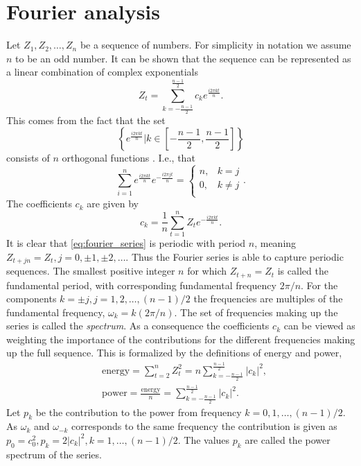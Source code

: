 \documentclass[a4paper, 10pt]{memoir}
\theoremstyle{plain}
\theoremstyle{definition}
\theoremstyle{remark}
\begin{document}
\section{Fourier analysis}
Let $Z_1, Z_2, \hdots, Z_n$ be a sequence of numbers.
For simplicity in notation we assume $n$ to be an odd number.
It can be shown that the sequence can be represented as a linear combination of complex exponentials
\begin{equation}\label{eq:fourier_series}
        Z_t = \sum_{k = -\frac{n-1}{2}}^{\frac{n- 1}{2}}c_k e^{\frac{i2 \pi k t}{n}}.
\end{equation}
This comes from the fact that the set 
\begin{equation*}
        \left\{ e^{\frac{i 2 \pi kt}{n}} \Big| k \in \left[ -\frac{n -1}{2}, \frac{n - 1}{2} \right] \right\}
\end{equation*}
consists of $n$ orthogonal functions \cite{wei}.
I.e., that
\begin{equation*}
        \sum_{i = 1}^{n} e^{\frac{i2 \pi kt}{n}} e^{-\frac{i 2 \pi j t}{n}}= 
                \begin{cases}
                        n, & k = j \\
                        0, & k \neq j \\
                \end{cases}
       .
\end{equation*}
The coefficients $c_k$ are given by
\begin{equation*}
       c_k =  \frac{1}{n}\sum_{ t = 1}^{n}Z_t e^{-\frac{i 2\pi kt}{n}}.
\end{equation*}
It is clear that \eqref{eq:fourier_series} is periodic with period $n$, meaning $Z_{t + jn} = Z_t, j = 0, \pm 1, \pm 2, \hdots$.
Thus the Fourier series is able to capture periodic sequences.
The smallest positive integer $n$ for which $Z_{t + n} = Z_t$ is called the fundamental period, with corresponding fundamental frequency $2 \pi /n$.
For the components $k = \pm j, j = 1, 2, \hdots, (n-1)/2$ the frequencies are multiples of the fundamental frequency, $\omega_k = k(2\pi/n)$.
The set of frequencies making up the series is called the \textit{spectrum}.
As a consequence the coefficients $c_k$ can be viewed as weighting the importance of the contributions for the different frequencies making up the full sequence.
This is formalized by the definitions of energy and power,
\begin{align}\label{eq:energy}
        &\text{energy} = \sum_{t = 2}^{n} Z_t^2 = n \sum_{k = -\frac{n -1}{2}}^{\frac{n - 1}{2}} |c_k|^2 ,\\ 
        \label{eq:power}
        &\text{power} = \frac{\text{energy}}{n} = \sum_{k = -\frac{n -1}{2}}^{\frac{n - 1}{2}} |c_k|^2. 
\end{align}
Let $p_k$ be the contribution to the power from frequency $k = 0, 1, \hdots, (n-1)/2$.
As $\omega_k$ and $\omega_{-k}$ corresponds to the same frequency the contribution is given as $p_0 = c_0^2, p_k = 2|c_k|^2, k = 1, \hdots, (n-1)/2$.
The values $p_k$ are called the power spectrum of the series.
\end{document}
